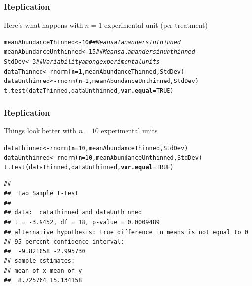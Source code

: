 \documentclass[color=usenames,dvipsnames]{beamer}\usepackage[]{graphicx}\usepackage[]{color}
\makeatletter
\newcommand{\hlnum}[1]{\textcolor[rgb]{0.69,0.494,0}{#1}}%
\newcommand{\hlcom}[1]{\textcolor[rgb]{0.514,0.506,0.514}{\textit{#1}}}%
\newcommand{\hlstd}[1]{\textcolor[rgb]{0,0,0}{#1}}%
\newcommand{\hlkwb}[1]{\textcolor[rgb]{0,0.341,0.682}{#1}}%
\newcommand{\hlkwc}[1]{\textcolor[rgb]{0,0,0}{\textbf{#1}}}%
\newcommand{\hlkwd}[1]{\textcolor[rgb]{0.004,0.004,0.506}{#1}}%
\newenvironment{kframe}{%
 \def\at@end@of@kframe{}%
 \ifinner\ifhmode%
  \def\at@end@of@kframe{\end{minipage}}%
  \begin{minipage}{\columnwidth}%
 \fi\fi%
 \def\FrameCommand##1{\hskip\@totalleftmargin \hskip-\fboxsep
 \colorbox{shadecolor}{##1}\hskip-\fboxsep
     \hskip-\linewidth \hskip-\@totalleftmargin \hskip\columnwidth}%
 \MakeFramed {\advance\hsize-\width
   \@totalleftmargin\z@ \linewidth\hsize
   \@setminipage}}%
 {\par\unskip\endMakeFramed%
 \at@end@of@kframe}
\newenvironment{knitrout}{}{} %
\makeatother
\begin{document}
\begin{frame}[fragile]
  \frametitle{Replication}
  Here's what happens with $n=1$ experimental unit (per treatment) \\
\begin{knitrout}\scriptsize
{}\color{fgcolor}\begin{kframe}
\begin{alltt}
\hlstd{meanAbundanceThinned} \hlkwb{<-} \hlnum{10}      \hlcom{## Mean salamanders in thinned}
\hlstd{meanAbundanceUnthinned} \hlkwb{<-} \hlnum{15}    \hlcom{## Mean salamanders in unthinned}
\hlstd{StdDev} \hlkwb{<-} \hlnum{3}                     \hlcom{## Variability among experimental units}
\hlstd{dataThinned} \hlkwb{<-} \hlkwd{rnorm}\hlstd{(}\hlkwc{n}\hlstd{=}\hlnum{1}\hlstd{, meanAbundanceThinned, StdDev)}
\hlstd{dataUnthinned} \hlkwb{<-} \hlkwd{rnorm}\hlstd{(}\hlkwc{n}\hlstd{=}\hlnum{1}\hlstd{, meanAbundanceUnthinned, StdDev)}
\hlkwd{t.test}\hlstd{(dataThinned, dataUnthinned,} \hlkwc{var.equal}\hlstd{=}\hlnum{TRUE}\hlstd{)}
\end{alltt}


{\ttfamily\noindent\bfseries\color{errorcolor}{\#\# Error in t.test.default(dataThinned, dataUnthinned, var.equal = TRUE): not enough observations}}\end{kframe}
\end{knitrout}
\end{frame}




\begin{frame}[fragile]
  \frametitle{Replication}
  Things look better with $n=10$ experimental units \\
\begin{knitrout}\scriptsize
{}\color{fgcolor}\begin{kframe}
\begin{alltt}
\hlstd{dataThinned} \hlkwb{<-} \hlkwd{rnorm}\hlstd{(}\hlkwc{n}\hlstd{=}\hlnum{10}\hlstd{, meanAbundanceThinned, StdDev)}
\hlstd{dataUnthinned} \hlkwb{<-} \hlkwd{rnorm}\hlstd{(}\hlkwc{n}\hlstd{=}\hlnum{10}\hlstd{, meanAbundanceUnthinned, StdDev)}
\hlkwd{t.test}\hlstd{(dataThinned, dataUnthinned,} \hlkwc{var.equal}\hlstd{=}\hlnum{TRUE}\hlstd{)}
\end{alltt}
\begin{verbatim}
## 
## 	Two Sample t-test
## 
## data:  dataThinned and dataUnthinned
## t = -3.9452, df = 18, p-value = 0.0009489
## alternative hypothesis: true difference in means is not equal to 0
## 95 percent confidence interval:
##  -9.821058 -2.995730
## sample estimates:
## mean of x mean of y 
##  8.725764 15.134158
\end{verbatim}
\end{kframe}
\end{knitrout}
\end{frame}
\end{document}
